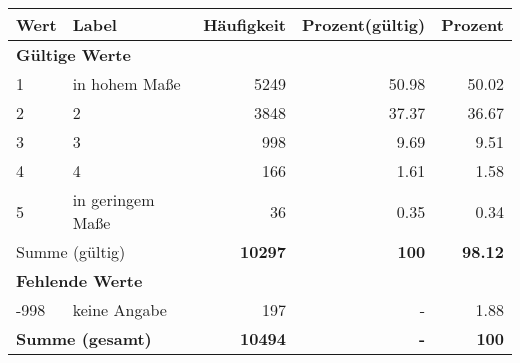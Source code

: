      \begin{longtable}{lXrrr}
     \toprule
     \textbf{Wert} & \textbf{Label} & \textbf{Häufigkeit} & \textbf{Prozent(gültig)} & \textbf{Prozent} \\
     \endhead
     \midrule
     \multicolumn{5}{l}{\textbf{Gültige Werte}}\\

     1 &
     \multicolumn{1}{X}{ in hohem Maße   } &


       \num{5249} &
       \num[round-mode=places,round-precision=2]{50.98} &
         \num[round-mode=places,round-precision=2]{50.02} \\

     2 &
     \multicolumn{1}{X}{ 2   } &


       \num{3848} &
       \num[round-mode=places,round-precision=2]{37.37} &
         \num[round-mode=places,round-precision=2]{36.67} \\

     3 &
     \multicolumn{1}{X}{ 3   } &


       \num{998} &
       \num[round-mode=places,round-precision=2]{9.69} &
         \num[round-mode=places,round-precision=2]{9.51} \\

     4 &
     \multicolumn{1}{X}{ 4   } &


       \num{166} &
       \num[round-mode=places,round-precision=2]{1.61} &
         \num[round-mode=places,round-precision=2]{1.58} \\

     5 &
     \multicolumn{1}{X}{ in geringem Maße   } &


       \num{36} &
       \num[round-mode=places,round-precision=2]{0.35} &
         \num[round-mode=places,round-precision=2]{0.34} \\
     \midrule
     \multicolumn{2}{l}{Summe (gültig)} &
       \textbf{\num{10297}} &
     \textbf{\num{100}} &
       \textbf{\num[round-mode=places,round-precision=2]{98.12}} \\
     \multicolumn{5}{l}{\textbf{Fehlende Werte}}\\
       -998 &
       keine Angabe &
         \num{197} &
        - &
         \num[round-mode=places,round-precision=2]{1.88} \\
     \midrule
     \multicolumn{2}{l}{\textbf{Summe (gesamt)}} &
          \textbf{\num{10494}} &
        \textbf{-} &
        \textbf{\num{100}} \\
     \bottomrule
     \end{longtable}
     
